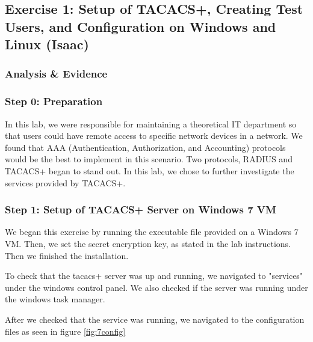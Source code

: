 \documentclass[main.tex]{subfiles}
\begin{document}
\subsection{Exercise 1: Setup of TACACS+, Creating Test Users, and Configuration on Windows and Linux (Isaac)}

\subsubsection{Analysis \& Evidence }

\subsubsection{Step 0: Preparation}
\hfill \break 
In this lab, we were responsible for maintaining a theoretical IT department so that users could have remote access to specific network devices in a network. We found that AAA (Authentication, Authorization, and Accounting) protocols would be the best to implement in this scenario. Two protocols, RADIUS and TACACS+ began to stand out. In this lab, we chose to further investigate the services provided by TACACS+.
\hfill \break
{}


\subsubsection{Step 1: Setup of TACACS+ Server on Windows 7 VM}
\hfill \break
We began this exercise by running the executable file provided on a Windows 7 VM.
Then, we set the secret encryption key, as stated in the lab instructions.
Then we finished the installation.


To check that the tacacs+ server was up and running, we navigated to "services" under the windows control panel. 
We also checked if the server was running under the windows task manager.


After we checked that the service was running, we navigated to the configuration files as seen in figure \ref{fig:7config}
\end{document}
